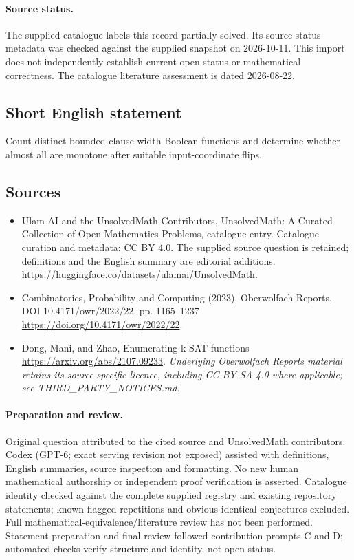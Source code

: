 \documentclass[11pt]{article}
\begin{document}
\paragraph{Source status.}
The supplied catalogue labels this record partially solved. Its source-status metadata was checked against the supplied snapshot on 2026-10-11. This import does not independently establish current open status or mathematical correctness. The catalogue literature assessment is dated 2026-08-22.
\subsection{Short English statement}
Count distinct bounded-clause-width Boolean functions and determine whether almost all are monotone after suitable input-coordinate flips.
\subsection{Sources}
\begin{itemize}
\item[S1] Ulam AI and the UnsolvedMath Contributors, UnsolvedMath: A Curated Collection of Open Mathematics Problems, catalogue entry. Catalogue curation and metadata: CC BY 4.0. The supplied source question is retained; definitions and the English summary are editorial additions.
\url{https://huggingface.co/datasets/ulamai/UnsolvedMath}.
\item[S2] Combinatorics, Probability and Computing (2023), Oberwolfach Reports, DOI 10.4171/owr/2022/22, pp. 1165--1237
\url{https://doi.org/10.4171/owr/2022/22}.
\item[S3] Dong, Mani, and Zhao, Enumerating k-SAT functions
\url{https://arxiv.org/abs/2107.09233}.
\textit{Underlying Oberwolfach Reports material retains its source-specific licence, including CC BY-SA 4.0 where applicable; see THIRD\_PARTY\_NOTICES.md.}
\end{itemize}
\paragraph{Preparation and review.}
Original question attributed to the cited source and UnsolvedMath contributors. Codex (GPT-6; exact serving revision not exposed) assisted with definitions, English summaries, source inspection and formatting. No new human mathematical authorship or independent proof verification is asserted. Catalogue identity checked against the complete supplied registry and existing repository statements; known flagged repetitions and obvious identical conjectures excluded. Full mathematical-equivalence/literature review has not been performed. Statement preparation and final review followed contribution prompts C and D; automated checks verify structure and identity, not open status.
\label{end:statement}
\end{document}
